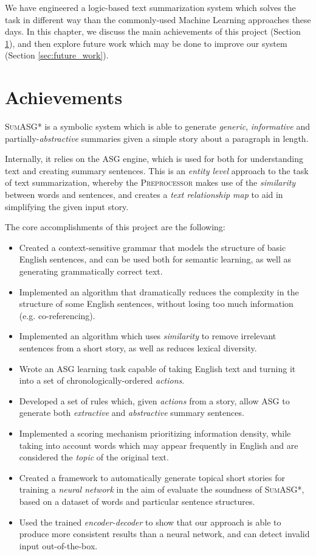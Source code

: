 \label{chapter:conclusion}

We have engineered a logic-based text summarization system which solves the task in different way than the commonly-used Machine Learning approaches these days. In this chapter, we discuss the main achievements of this project (Section \ref{sec:achievements}), and then explore future work which may be done to improve our system (Section \ref{sec:future_work}).

\section{Achievements}
\label{sec:achievements}

\textsc{SumASG*} is a symbolic system which is able to generate \textit{generic}, \textit{informative} and partially-\textit{abstractive} summaries given a simple story about a paragraph in length.

Internally, it relies on the ASG engine, which is used for both for understanding text and creating summary sentences. This is an \textit{entity level} approach to the task of text summarization, whereby the \textsc{Preprocessor} makes use of the \textit{similarity} between words and sentences, and creates a \textit{text relationship map} to aid in simplifying the given input story.

The core accomplishments of this project are the following:

\begin{itemize}
\item Created a context-sensitive grammar that models the structure of basic English sentences, and can be used both for semantic learning, as well as generating grammatically correct text.
\item Implemented an algorithm that dramatically reduces the complexity in the structure of some English sentences, without losing too much information (e.g. co-referencing).
\item Implemented an algorithm which uses \textit{similarity} to remove irrelevant sentences from a short story, as well as reduces lexical diversity.
\item Wrote an ASG learning task capable of taking English text and turning it into a set of chronologically-ordered \textit{actions}.
\item Developed a set of rules which, given \textit{actions} from a story, allow ASG to generate both \textit{extractive} and \textit{abstractive} summary sentences.
\item Implemented a scoring mechanism prioritizing information density, while taking into account words which may appear frequently in English and are considered the \textit{topic} of the original text.
\item Created a framework to automatically generate topical short stories for training a \textit{neural network} in the aim of evaluate the soundness of \textsc{SumASG*}, based on a dataset of words and particular sentence structures.
\item Used the trained \textit{encoder-decoder} to show that our approach is able to produce more consistent results than a neural network, and can detect invalid input out-of-the-box.
\end{itemize}

